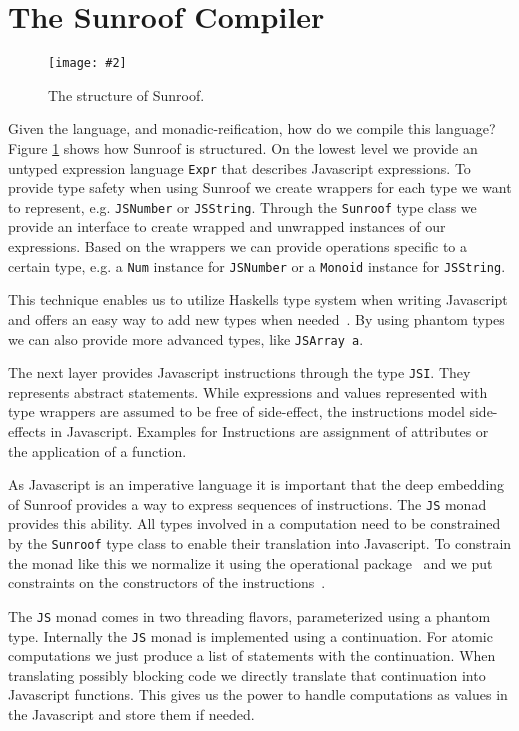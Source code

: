 \documentclass{llncs}
\newcommand{\Src}[1]{{\tt{#1}}}
\newcommand{\Figure}[3]{%
\begin{figure}[h]%
\vspace{-0.5cm}%
\begin{center}%
\texttt{[image: \#2]}%
\vspace{-0.5cm}%
\end{center}%
\caption{#3}%
\label{#1}%
\vspace{-0.5cm}%
\end{figure}%
}
\begin{document}
\section{The Sunroof Compiler}

\Figure{fig:structure}{../figures/sunroof-structure.pdf}{The structure of Sunroof.}

Given the language, and monadic-reification, how do we  compile this language? 
Figure \ref{fig:structure} shows how Sunroof is structured.
On the lowest level we provide an untyped expression language \Src{Expr}
that describes Javascript expressions. 
To provide type safety when using Sunroof we create
wrappers for each type we want to represent, e.g. \Src{JSNumber} or \Src{JSString}.
Through the \Src{Sunroof} type class we provide an 
interface to create wrapped and unwrapped
instances of our expressions. Based on the wrappers we can provide 
operations specific to a certain type, e.g. a \Src{Num} instance
for \Src{JSNumber} or a \Src{Monoid} instance for \Src{JSString}.

This technique enables us to utilize  Haskells type system when writing Javascript
and offers an easy way to add new types when needed~\cite{Svenningsson:12:CombiningEmbedding}.
By using phantom types we can also provide more advanced types,
like \Src{JSArray a}.

The next layer provides Javascript instructions through the type \Src{JSI}.
They represents abstract statements. While expressions and values
represented with type wrappers are assumed to be free of side-effect,
the instructions model side-effects in Javascript. Examples for Instructions
are assignment of attributes or the application of a function.

As Javascript is an imperative language it is important that the deep embedding
of Sunroof provides a way to express sequences of instructions. 
The \Src{JS} monad provides this ability.
All types involved in a computation need to be constrained by the 
\Src{Sunroof} type class to enable their translation into Javascript.
To constrain the monad like this we normalize it using the operational
package~\cite{Hackage:10:Operational,Apfelmus:10:Operational} and
we put constraints on the constructors of the instructions~\cite{Sculthorpe:13:ConstrainedMonads}.

The \Src{JS} monad comes in two threading flavors, parameterized using a phantom type.
Internally the \Src{JS} monad is implemented using a continuation. For atomic
computations we just produce a list of statements with the continuation. 
When translating possibly blocking code we directly translate that continuation
into Javascript functions. This gives us the power to handle 
computations as values in the Javascript and store them if needed.
\end{document}
